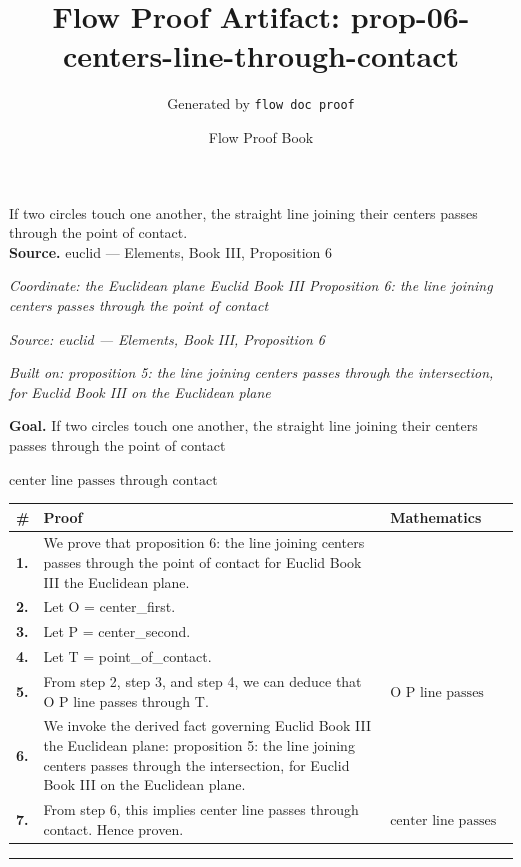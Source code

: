 \documentclass[11pt]{article}
\title{Flow Proof Artifact: prop-06-centers-line-through-contact}
\author{Generated by \texttt{flow doc proof}}
\date{Flow Proof Book}
\theoremstyle{definition}
\begin{document}
\maketitle
If two circles touch one another, the straight line joining their centers passes through the point of contact.\\[0.5em]
\textbf{Source.} euclid — Elements, Book III, Proposition 6\\[0.5em]
\bigskip
{}\par
\smallskip\noindent\textit{Coordinate: the Euclidean plane \cdot Euclid Book III \cdot Proposition 6: the line joining centers passes through the point of contact}\par
\smallskip\noindent\textit{Source: euclid — Elements, Book III, Proposition 6}\par
\smallskip\noindent\textit{Built on: proposition 5: the line joining centers passes through the intersection, for Euclid Book III on the Euclidean plane}\par
\medskip
\noindent\textbf{Goal.} If two circles touch one another, the straight line joining their centers passes through the point of contact\par
\noindent$\displaystyle \text{center line passes through contact}$\par
\medskip
\noindent
\begin{tabular}{@{} >{\raggedright\arraybackslash}p{} >{\raggedright\arraybackslash}p{} >{\raggedleft\arraybackslash}p{} @{}}
\textbf{\#} & \textbf{Proof} & \textbf{Mathematics} \\
\midrule
\textbf{1.} & We prove that proposition 6: the line joining centers passes through the point of contact for Euclid Book III the Euclidean plane. & \\[0.45em]
\textbf{2.} & Let O = center\_first. & \\[0.45em]
\textbf{3.} & Let P = center\_second. & \\[0.45em]
\textbf{4.} & Let T = point\_of\_contact. & \\[0.45em]
\textbf{5.} & From step 2, step 3, and step 4, we can deduce that O P line passes through T. & $\displaystyle \text{O P line passes through T}$ \\[0.45em]
\textbf{6.} & We invoke the derived fact governing Euclid Book III the Euclidean plane: proposition 5: the line joining centers passes through the intersection, for Euclid Book III on the Euclidean plane. & \\[0.45em]
\textbf{7.} & From step 6, this implies center line passes through contact. Hence proven. & $\displaystyle \text{center line passes through contact}$ \\[0.45em]
\bottomrule
\end{tabular}
\label{thm:Geometry-Euclid Book III-proposition_6_the_line_joining_centers_passes_through_the_point_of_contact}
\par\medskip\hrule
\end{document}

